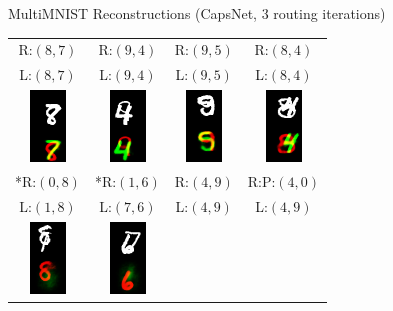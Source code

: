 \documentclass{beamer}
\begin{document}
{    \begin{frame}{MultiMNIST Reconstructions (CapsNet, 3 routing iterations)}
      \begin{center}
        \begin{tabular}{c c c c}
          R:$(8,7)$ & R:$(9,4)$ & R:$(9,5)$ & R:$(8,4)$ \\
          L:$(8,7)$ & L:$(9,4)$ & L:$(9,5)$ & L:$(8,4)$ \\
          \includegraphics[height=.3\textheight]{../img/recons/87} &
          \includegraphics[height=.3\textheight]{../img/recons/94} &
          \includegraphics[height=.3\textheight]{../img/recons/95} &
          \includegraphics[height=.3\textheight]{../img/recons/84} \\
          \pause
          *R:$(0,8)$ & *R:$(1,6)$ & R:$(4,9)$ &  R:P:$(4, 0)$ \\
           L:$(1,8)$ &  L:$(7,6)$ & L:$(4, 9)$ & L:$(4, 9)$ \\
          \includegraphics[height=.3\textheight]{../img/recons/1_8_8_1_264} &
          \includegraphics[height=.3\textheight]{../img/recons/7_6_6_7_4} &

\end{tabular}
\end{center}
\end{frame}}
\end{document}
